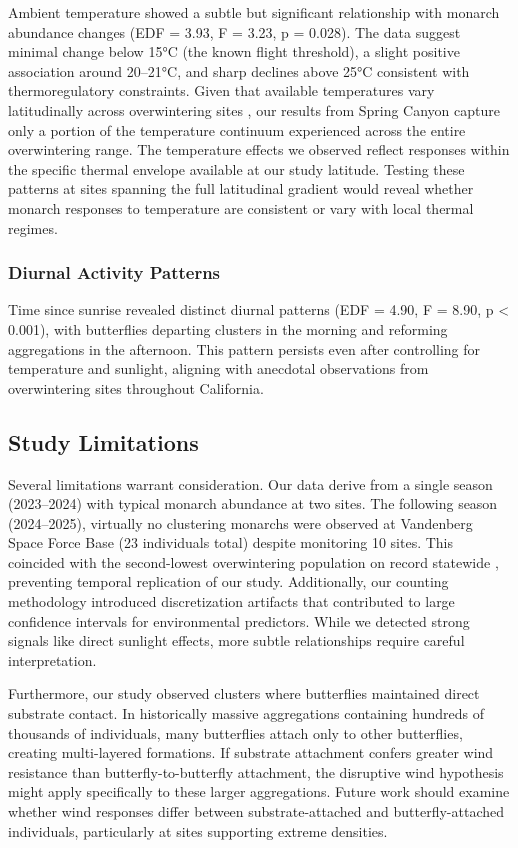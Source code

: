 Ambient temperature showed a subtle but significant relationship with monarch abundance changes (EDF = 3.93, F = 3.23, p = 0.028). The data suggest minimal change below 15°C (the known flight threshold), a slight positive association around 20--21°C, and sharp declines above 25°C consistent with thermoregulatory constraints. Given that available temperatures vary latitudinally across overwintering sites \autocite{Saniee2022_3VN7I68M}, our results from Spring Canyon capture only a portion of the temperature continuum experienced across the entire overwintering range. The temperature effects we observed reflect responses within the specific thermal envelope available at our study latitude. Testing these patterns at sites spanning the full latitudinal gradient would reveal whether monarch responses to temperature are consistent or vary with local thermal regimes.

\subsubsection{Diurnal Activity Patterns}

Time since sunrise revealed distinct diurnal patterns (EDF = 4.90, F = 8.90, p < 0.001), with butterflies departing clusters in the morning and reforming aggregations in the afternoon. This pattern persists even after controlling for temperature and sunlight, aligning with anecdotal observations from overwintering sites throughout California.

\subsection{Study Limitations}

Several limitations warrant consideration. Our data derive from a single season (2023--2024) with typical monarch abundance at two sites. The following season (2024--2025), virtually no clustering monarchs were observed at Vandenberg Space Force Base (23 individuals total) despite monitoring 10 sites. This coincided with the second-lowest overwintering population on record statewide \autocite{xerces_society_western_2025}, preventing temporal replication of our study. Additionally, our counting methodology introduced discretization artifacts that contributed to large confidence intervals for environmental predictors. While we detected strong signals like direct sunlight effects, more subtle relationships require careful interpretation.

Furthermore, our study observed clusters where butterflies maintained direct substrate contact. In historically massive aggregations containing hundreds of thousands of individuals, many butterflies attach only to other butterflies, creating multi-layered formations. If substrate attachment confers greater wind resistance than butterfly-to-butterfly attachment, the disruptive wind hypothesis might apply specifically to these larger aggregations. Future work should examine whether wind responses differ between substrate-attached and butterfly-attached individuals, particularly at sites supporting extreme densities.

